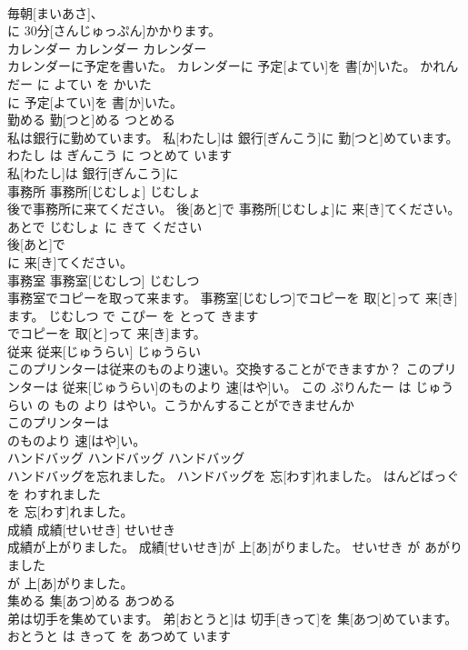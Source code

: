 \documentclass[8pt]{extreport}
\begin{document}
\begin{CJK}{UTF8}{min}
\\	毎朝[まいあさ]、
\\	に 30分[さんじゅっぷん]かかります。			
\\	カレンダー	カレンダー	カレンダー	
\\	カレンダーに予定を書いた。	カレンダーに 予定[よてい]を 書[か]いた。	かれんだー に よてい を かいた	
\\	に 予定[よてい]を 書[か]いた。			
\\	勤める	勤[つと]める	つとめる	
\\	私は銀行に勤めています。	私[わたし]は 銀行[ぎんこう]に 勤[つと]めています。	わたし は ぎんこう に つとめて います	
\\	私[わたし]は 銀行[ぎんこう]に
\\	事務所	事務所[じむしょ]	じむしょ	
\\	後で事務所に来てください。	後[あと]で 事務所[じむしょ]に 来[き]てください。	あとで じむしょ に きて ください	
\\	後[あと]で
\\	に 来[き]てください。			
\\	事務室	事務室[じむしつ]	じむしつ	
\\	事務室でコピーを取って来ます。	事務室[じむしつ]でコピーを 取[と]って 来[き]ます。	じむしつ で こぴー を とって きます	
\\	でコピーを 取[と]って 来[き]ます。			
\\	従来	従来[じゅうらい]	じゅうらい	
\\	このプリンターは従来のものより速い。交換することができますか？	このプリンターは 従来[じゅうらい]のものより 速[はや]い。	この ぷりんたー は じゅうらい の もの より はやい。こうかんすることができませんか	
\\	このプリンターは
\\	のものより 速[はや]い。			
\\	ハンドバッグ	ハンドバッグ	ハンドバッグ	
\\	ハンドバッグを忘れました。	ハンドバッグを 忘[わす]れました。	はんどばっぐ を わすれました	
\\	を 忘[わす]れました。			
\\	成績	成績[せいせき]	せいせき	
\\	成績が上がりました。	成績[せいせき]が 上[あ]がりました。	せいせき が あがりました	
\\	が 上[あ]がりました。			
\\	集める	集[あつ]める	あつめる	
\\	弟は切手を集めています。	弟[おとうと]は 切手[きって]を 集[あつ]めています。	おとうと は きって を あつめて います	

\end{CJK}
\end{document}
